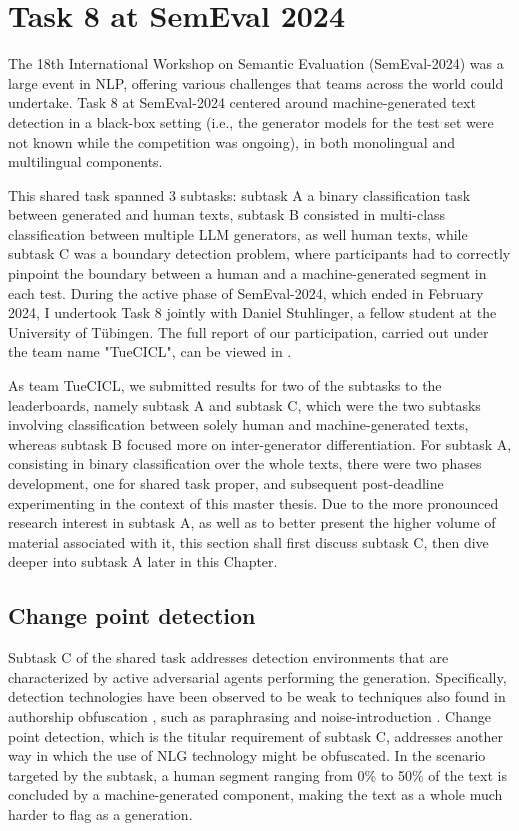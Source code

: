 \section{Task 8 at SemEval 2024}
\label{sec:task}

The 18th International Workshop on Semantic Evaluation (SemEval-2024) was a large event in NLP, offering various challenges that teams across the world could undertake.
Task 8 at SemEval-2024 \citep{wang2024semeval} centered around machine-generated text detection in a black-box setting (i.e., the generator models for the test set were not known while the competition was ongoing), in both monolingual and multilingual components.

This shared task spanned 3 subtasks: subtask A a binary classification task between generated and human texts, subtask B consisted in multi-class classification between multiple LLM generators, as well human texts, while subtask C was a boundary detection problem, where participants had to correctly pinpoint the boundary between a human and a machine-generated segment in each test.
During the active phase of SemEval-2024, which ended in February 2024, I undertook Task 8 jointly with Daniel Stuhlinger, a fellow student at the University of Tübingen.
The full report of our participation, carried out under the team name "TueCICL", can be viewed in \citet{stuhlinger-winkler-2024-tuecicl}.

As team TueCICL, we submitted results for two of the subtasks to the leaderboards, namely subtask A and subtask C, which were the two subtasks involving classification between solely human and machine-generated texts, whereas subtask B focused more on inter-generator differentiation.
For subtask A, consisting in binary classification over the whole texts, there were two phases development, one for shared task proper, and subsequent post-deadline experimenting in the context of this master thesis.
Due to the more pronounced research interest in subtask A, as well as to better present the higher volume of material associated with it, this section shall first discuss subtask C, then dive deeper into subtask A later in this Chapter.

\subsection{Change point detection}

Subtask C of the shared task addresses detection environments that are characterized by active adversarial agents performing the generation.
Specifically, detection technologies have been observed to be weak to techniques also found in authorship obfuscation \citep{macko2024authorship}, such as paraphrasing \citep{krishna2024paraphrasing} and noise-introduction \citep{wang2021adversarial}.
Change point detection, which is the titular requirement of subtask C, addresses another way in which the use of NLG technology might be obfuscated.
In the scenario targeted by the subtask, a human segment ranging from 0\% to 50\% of the text is concluded by a machine-generated component, making the text as a whole much harder to flag as a generation.


